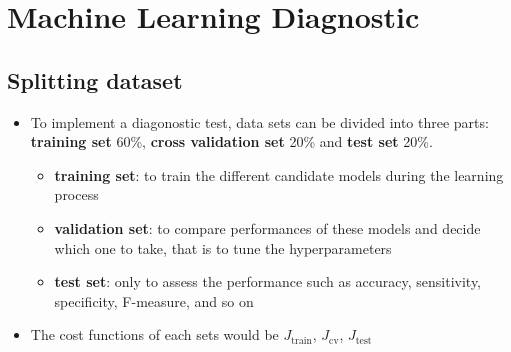 \chapter{Machine Learning Diagnostic}


\section{Splitting dataset}
\begin{itemize}
    \item To implement a diagonostic test, data sets can be divided into three parts: \textbf{training set} 60\%, \textbf{cross validation set} 20\% and \textbf{test set} 20\%.
    
    \begin{itemize}
        \item \textbf{training set}: to train the different candidate models during the learning process
        \item \textbf{validation set}: to compare performances of these models and decide which one to take, that is to tune the hyperparameters
        \item \textbf{test set}: only to assess the performance such as accuracy, sensitivity, specificity, F-measure, and so on
    \end{itemize}

    \item The cost functions of each sets would be $J_{\text{train}}$, $J_{\text{cv}}$, $J_{\text{test}}$

\end{itemize}


